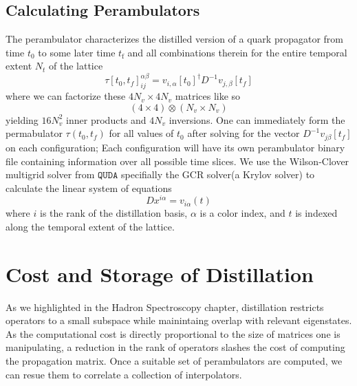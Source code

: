 \subsection{Calculating Perambulators}
The perambulator characterizes the distilled version of a quark propagator from time $t_0$ to some later time $t_{\text{f}}$ and all combinations therein for the entire temporal extent $N_t$ of the lattice \cite{peardon_novel_2009}
\begin{equation}
  \tau[t_0,t_f]_{ij}^{\alpha\beta} = v_{i,\alpha}[t_0]^{\dagger} D^{-1}v_{j,\beta}[t_f]
\end{equation} where we can factorize these $4N_v \times 4N_v$ matrices like so 
\begin{equation}
  (4 \times 4) \otimes (N_v \times N_v)
\end{equation} yielding $16N_v^2$ inner products and $4N_v$ inversions. One can immediately form the permabulator $\tau(t_0,t_f)$ for all values of $t_0$ after solving for the vector $D^{-1}v_{j\beta}[t_f]$ on each configuration; Each configuration will have its own perambulator binary file containing information over all possible time slices. We use the Wilson-Clover multigrid solver from $\texttt{QUDA}$ \cite{quda} specifially the GCR solver(a Krylov solver) to calculate the linear system of equations 
\begin{equation}
  Dx^{i\alpha} = v_{i\alpha}(t)
\end{equation} where $i$ is the rank of the distillation basis, $\alpha$ is a color index, and $t$ is indexed along the temporal extent of the lattice. 


\section{Cost and Storage of Distillation}
      As we highlighted in the Hadron Spectroscopy chapter, distillation restricts operators to a small subspace while mainintaing overlap with relevant eigenstates. As the computational cost is directly proportional to the size of matrices one is manipulating, a reduction in the rank of operators slashes the cost of computing the propagation matrix. Once a suitable set of perambulators are computed, we can resue them to correlate a collection of interpolators.

      \vspace{1em}
       
